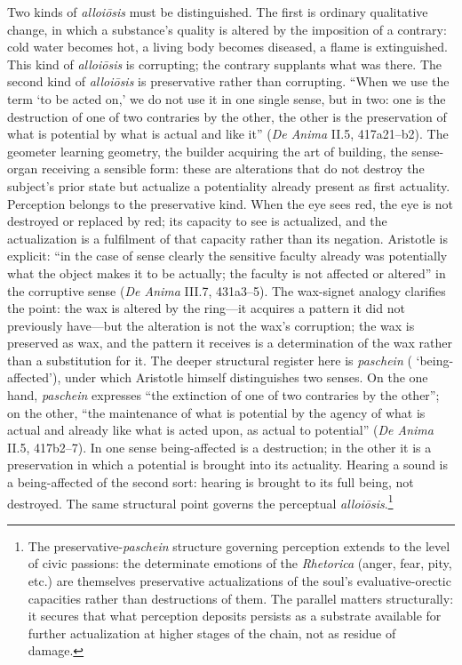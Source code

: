 Two kinds of \textit{alloiōsis} must be distinguished. The first is ordinary qualitative change, in which a substance's quality is altered by the imposition of a contrary: cold water becomes hot, a living body becomes diseased, a flame is extinguished. This kind of \textit{alloiōsis} is corrupting; the contrary supplants what was there. The second kind of \textit{alloiōsis} is preservative rather than corrupting. ``When we use the term `to be acted on,' we do not use it in one single sense, but in two: one is the destruction of one of two contraries by the other, the other is the preservation of what is potential by what is actual and like it'' (\textit{De Anima} II.5, 417a21--b2). The geometer learning geometry, the builder acquiring the art of building, the sense-organ receiving a sensible form: these are alterations that do not destroy the subject's prior state but actualize a potentiality already present as first actuality. Perception belongs to the preservative kind. When the eye sees red, the eye is not destroyed or replaced by red; its capacity to see is actualized, and the actualization is a fulfilment of that capacity rather than its negation. Aristotle is explicit: ``in the case of sense clearly the sensitive faculty already was potentially what the object makes it to be actually; the faculty is not affected or altered'' in the corruptive sense (\textit{De Anima} III.7, 431a3--5). The wax-signet analogy clarifies the point: the wax is altered by the ring---it acquires a pattern it did not previously have---but the alteration is not the wax's corruption; the wax is preserved as wax, and the pattern it receives is a determination of the wax rather than a substitution for it. The deeper structural register here is \textit{paschein} ( `being-affected'), under which Aristotle himself distinguishes two senses. On the one hand, \textit{paschein} expresses ``the extinction of one of two contraries by the other''; on the other, ``the maintenance of what is potential by the agency of what is actual and already like what is acted upon, as actual to potential'' (\textit{De Anima} II.5, 417b2--7). In one sense being-affected is a destruction; in the other it is a preservation in which a potential is brought into its actuality. Hearing a sound is a being-affected of the second sort: hearing is brought to its full being, not destroyed. The same structural point governs the perceptual \textit{alloiōsis}.\footnote{The preservative-\textit{paschein} structure governing perception extends to the level of civic passions: the determinate emotions of the \textit{Rhetorica} (anger, fear, pity, etc.) are themselves preservative actualizations of the soul's evaluative-orectic capacities rather than destructions of them. The parallel matters structurally: it secures that what perception deposits persists as a substrate available for further actualization at higher stages of the chain, not as residue of damage.}

